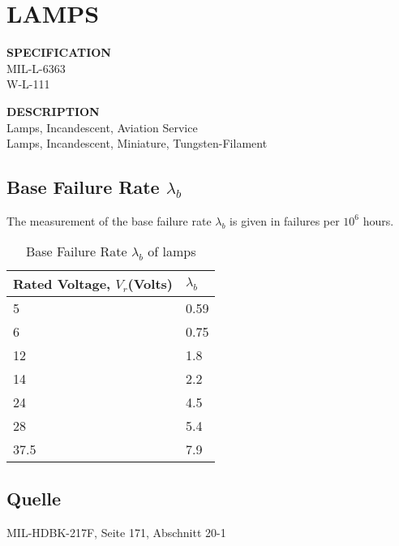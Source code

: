 \section{LAMPS}

\begin{minipage}[t]{0.29\textwidth}
    \textbf{SPECIFICATION}\\
    MIL-L-6363\\W-L-111
\end{minipage}
\begin{minipage}[t]{0.7\textwidth}
    \textbf{DESCRIPTION}\\
    Lamps, Incandescent, Aviation Service\\
    Lamps, Incandescent, Miniature, Tungsten-Filament\\
\end{minipage}

\subsection{Base Failure Rate $\lambda_b$}
The measurement of the base failure rate $\lambda_b$ is given in failures per $10^6$ hours.
\begin{table}[ht]
{\centering

\begin{tabular}{|p{5cm}|p{5cm}|}
    \hline
    \textbf{Rated Voltage, $V_r$(Volts)} & \textbf{$\lambda_b$} \\
    \hline
    5 & 0.59 \\
    \hline
    6 & 0.75 \\
    \hline
    12 & 1.8 \\
    \hline
    14 & 2.2 \\
    \hline
    24 & 4.5 \\
    \hline
    28 & 5.4 \\
    \hline
    37.5 & 7.9 \\
    \hline
\end{tabular}

\caption{Base Failure Rate $\lambda_b$ of lamps}

\label{tab:bfr_lamps}
\par}
\end{table}
\subsection*{Quelle}
MIL-HDBK-217F, Seite 171, Abschnitt 20-1